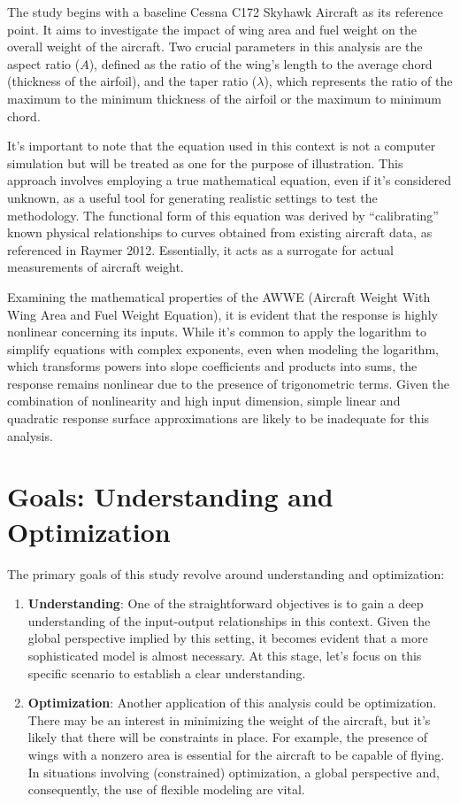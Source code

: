 \documentclass[
  letterpaper,
  DIV=11,
  numbers=noendperiod]{scrreprt}
\begin{document}
The study begins with a baseline Cessna C172 Skyhawk Aircraft as its
reference point. It aims to investigate the impact of wing area and fuel
weight on the overall weight of the aircraft. Two crucial parameters in
this analysis are the aspect ratio (\(A\)), defined as the ratio of the
wing's length to the average chord (thickness of the airfoil), and the
taper ratio (\(\lambda\)), which represents the ratio of the maximum to
the minimum thickness of the airfoil or the maximum to minimum chord.

It's important to note that the equation used in this context is not a
computer simulation but will be treated as one for the purpose of
illustration. This approach involves employing a true mathematical
equation, even if it's considered unknown, as a useful tool for
generating realistic settings to test the methodology. The functional
form of this equation was derived by ``calibrating'' known physical
relationships to curves obtained from existing aircraft data, as
referenced in Raymer 2012. Essentially, it acts as a surrogate for
actual measurements of aircraft weight.

Examining the mathematical properties of the AWWE (Aircraft Weight With
Wing Area and Fuel Weight Equation), it is evident that the response is
highly nonlinear concerning its inputs. While it's common to apply the
logarithm to simplify equations with complex exponents, even when
modeling the logarithm, which transforms powers into slope coefficients
and products into sums, the response remains nonlinear due to the
presence of trigonometric terms. Given the combination of nonlinearity
and high input dimension, simple linear and quadratic response surface
approximations are likely to be inadequate for this analysis.

\section{Goals: Understanding and
Optimization}\label{goals-understanding-and-optimization}

The primary goals of this study revolve around understanding and
optimization:

\begin{enumerate}
\def\labelenumi{\arabic{enumi}.}
\item
  \textbf{Understanding}: One of the straightforward objectives is to
  gain a deep understanding of the input-output relationships in this
  context. Given the global perspective implied by this setting, it
  becomes evident that a more sophisticated model is almost necessary.
  At this stage, let's focus on this specific scenario to establish a
  clear understanding.
\item
  \textbf{Optimization}: Another application of this analysis could be
  optimization. There may be an interest in minimizing the weight of the
  aircraft, but it's likely that there will be constraints in place. For
  example, the presence of wings with a nonzero area is essential for
  the aircraft to be capable of flying. In situations involving
  (constrained) optimization, a global perspective and, consequently,
  the use of flexible modeling are vital.
\end{enumerate}
\end{document}
